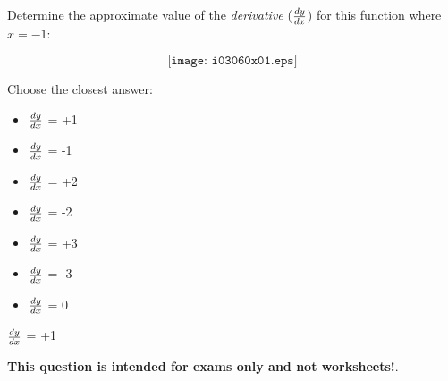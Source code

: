 

Determine the approximate value of the {\it derivative} ($dy \over dx$) for this function where $x=-1$:

$$\texttt{[image: i03060x01.eps]}$$

Choose the closest answer:

\begin{itemize}
\item{} $dy \over dx$ = +1
\vskip 10pt 
\item{} $dy \over dx$ = -1
\vskip 10pt 
\item{} $dy \over dx$ = +2
\vskip 10pt 
\item{} $dy \over dx$ = -2
\vskip 10pt 
\item{} $dy \over dx$ = +3
\vskip 10pt 
\item{} $dy \over dx$ = -3
\vskip 10pt 
\item{} $dy \over dx$ = 0
\end{itemize}







$dy \over dx$ = +1







{\bf This question is intended for exams only and not worksheets!}.



